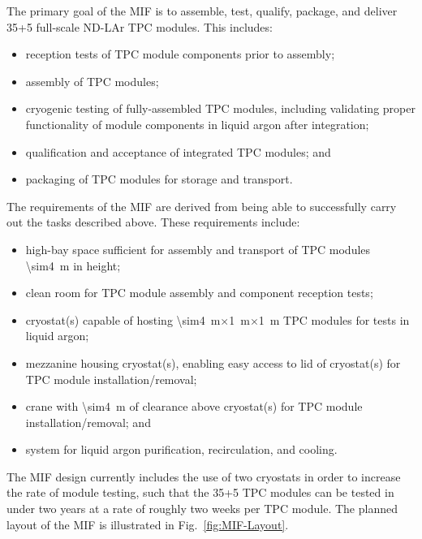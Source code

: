 The primary goal of the MIF is to assemble, test, qualify, package, and deliver 35+5 full-scale ND-LAr TPC modules.  This includes:
\begin{itemize}
    \item reception tests of TPC module components prior to assembly;
    \item assembly of TPC modules;
    \item cryogenic testing of fully-assembled TPC modules, including validating proper functionality of module components in liquid argon after integration;
    \item qualification and acceptance of integrated TPC modules; and
    \item packaging of TPC modules for storage and transport.
\end{itemize}
The requirements of the MIF are derived from being able to successfully carry out the tasks described above.  These requirements include:
\begin{itemize}
    \item high-bay space sufficient for assembly and transport of TPC modules \SI{\sim4}{m} in height;
    \item clean room for TPC module assembly and component reception tests;
    \item cryostat(s) capable of hosting \SI{\sim4}{m}$\times$\SI{1}{m}$\times$\SI{1}{m} TPC modules for tests in liquid argon;
    \item mezzanine housing cryostat(s), enabling easy access to lid of cryostat(s) for TPC module installation/removal;
    \item crane with \SI{\sim4}{m} of clearance above cryostat(s) for TPC module installation/removal; and
    \item system for liquid argon purification, recirculation, and cooling.
\end{itemize}
The MIF design currently includes the use of two cryostats in order to increase the rate of module testing, such that the 35+5 TPC modules can be tested in under two years at a rate of roughly two weeks per TPC module.  The planned layout of the MIF is illustrated in Fig.~\ref{fig:MIF-Layout}.

